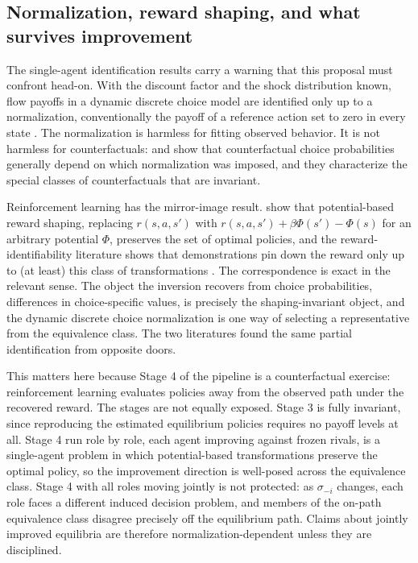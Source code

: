 \documentclass[11pt]{article}
\theoremstyle{definition}
\begin{document}
\subsection{Normalization, reward shaping, and what survives improvement}
\label{sec:norm}

The single-agent identification results carry a warning that this proposal must confront head-on. With the discount factor and the shock distribution known, flow payoffs in a dynamic discrete choice model are identified only up to a normalization, conventionally the payoff of a reference action set to zero in every state \citep{magnacThesmar2002, noretsTang2014}. The normalization is harmless for fitting observed behavior. It is not harmless for counterfactuals: \citet{kss2021} and \citet{aguirregabiriaSuzuki2014} show that counterfactual choice probabilities generally depend on which normalization was imposed, and they characterize the special classes of counterfactuals that are invariant.

Reinforcement learning has the mirror-image result. \citet{ngHaradaRussell1999} show that potential-based reward shaping, replacing $r(s,a,s')$ with $r(s,a,s') + \beta\Phi(s') - \Phi(s)$ for an arbitrary potential $\Phi$, preserves the set of optimal policies, and the reward-identifiability literature shows that demonstrations pin down the reward only up to (at least) this class of transformations \citep{kim2021, cao2021, skalse2023}. The correspondence is exact in the relevant sense. The object the \citet{hotzMiller1993} inversion recovers from choice probabilities, differences in choice-specific values, is precisely the shaping-invariant object, and the dynamic discrete choice normalization is one way of selecting a representative from the equivalence class. The two literatures found the same partial identification from opposite doors.

This matters here because Stage 4 of the pipeline is a counterfactual exercise: reinforcement learning evaluates policies away from the observed path under the recovered reward. The stages are not equally exposed. Stage 3 is fully invariant, since reproducing the estimated equilibrium policies requires no payoff levels at all. Stage 4 run role by role, each agent improving against frozen rivals, is a single-agent problem in which potential-based transformations preserve the optimal policy, so the improvement direction is well-posed across the equivalence class. Stage 4 with all roles moving jointly is not protected: as $\sigma_{-i}$ changes, each role faces a different induced decision problem, and members of the on-path equivalence class disagree precisely off the equilibrium path. Claims about jointly improved equilibria are therefore normalization-dependent unless they are disciplined.
\end{document}
